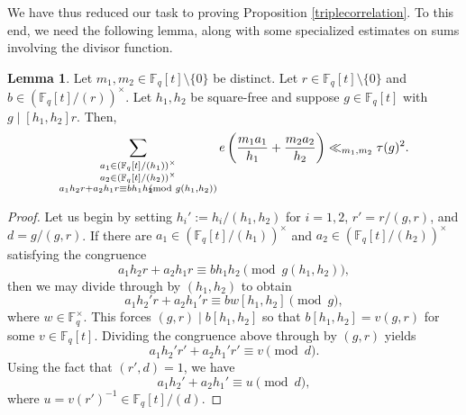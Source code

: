 \documentclass{article}
\theoremstyle{definition}
\newtheorem{lem}{Lemma}[section]
\theoremstyle{definition}
\theoremstyle{remark}
\newcommand{\F}{\mathbb{F}_q[t]}
\newcommand{\1}{\mathbf{1}}
\numberwithin{equation}{section}
\begin{document}
We have thus reduced our task to proving Proposition \ref{triplecorrelation}. To this end, we need the following lemma, along with some specialized estimates on sums involving the divisor function. 
\begin{lem}\label{lem:divisorspecial}
Let $m_1,m_2\in \F\setminus \{0\}$ be distinct. Let $r\in \F\setminus\{0\}$ and $b\in (\F\slash (r))^\times$. Let $h_1,h_2$ be square-free and suppose $g\in \F$ with $g\mid [h_1,h_2]r$. Then, 
\[\sum_{\substack{a_1\in (\F/(h_1))^\times\\a_2\in (\F/(h_2))^\times\\a_1h_2r+a_2h_1r\equiv bh_1h_2\hspace*{-2.5mm}\pmod{g(h_1,h_2)}}}e\left(\frac{m_1a_1}{h_1}+\frac{m_2a_2}{h_2}\right)\ll_{m_1,m_2}\tau(g)^2.\]
\end{lem}
\begin{proof}
Let us begin by setting $h_i':=h_i\slash (h_1,h_2)$ for $i=1,2$, $r'=r\slash (g,r)$, and $d=g\slash (g,r)$. If there are $a_1\in (\F/(h_1))^\times$ and $a_2\in (\F/(h_2))^\times$ satisfying the congruence  
\[a_1h_2r+a_2h_1r\equiv bh_1h_2\pmod{g(h_1,h_2)},\]
then we may divide through by $(h_1,h_2)$ to obtain 
\[a_1h_2'r+a_2h_1'r\equiv b w [h_1,h_2]\pmod{g},\]
where $w\in \mathbb{F}_q^{\times}$. This forces $(g,r)\mid b[h_1,h_2]$ so that $b[h_1,h_2]=v(g,r)$ for some $v\in\F$. Dividing the congruence above through by $(g,r)$ yields 
\[a_1h_2'r'+a_2h_1'r'\equiv v\pmod{d}.\]
Using the fact that $(r',d)=1$, we have 
\[a_1h_2'+a_2h_1'\equiv u\pmod{d},\]
where $u=v(r')^{-1}\in\F/(d)$. 


\end{proof}
\end{document}
